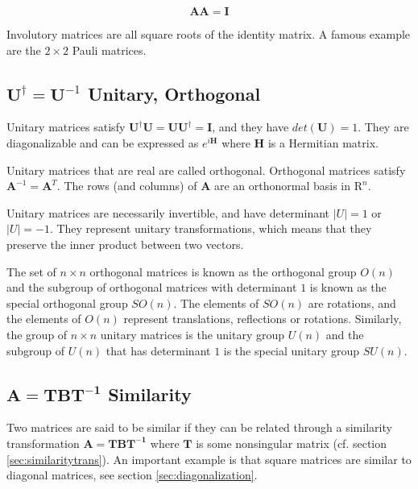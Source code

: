 \begin{equation}
\mathbf{A}\mathbf{A}=\mathbf{I}
\end{equation}

Involutory matrices are all square roots of the identity matrix. A famous example are the $2\times 2$ Pauli matrices. 




\subsection{$\mathbf{U}^{\dagger} = \mathbf{U}^{-1}$ Unitary, Orthogonal}
Unitary matrices satisfy $\mathbf{U}^{\dagger}\mathbf{U} = \mathbf{UU}^{\dagger}=\mathbf{I}$, and they have $det(\mathbf{U}) = 1$. They are diagonalizable and can be expressed as $e^{i\mathbf{H}}$ where $\mathbf{H}$ is a Hermitian matrix.

Unitary matrices that are real are called orthogonal.  Orthogonal matrices satisfy $\mathbf{A}^{-1} = \mathbf{A}^T$. The rows (and columns) of $\mathbf{A}$ are an orthonormal basis in $\mathrm{R}^n$.

Unitary matrices are necessarily invertible, and have determinant $|U|=1$ or $|U|=-1$. They represent unitary transformations, which means that they preserve the inner product between two vectors.

The set of $n \times n$ orthogonal matrices is known as the orthogonal group $O(n)$ and the subgroup of orthogonal matrices with determinant $1$ is known as the special orthogonal group $SO(n)$. The elements of $SO(n)$ are rotations, and the elements of $O(n)$ represent translations, reflections or rotations. Similarly, the group of $n \times n$ unitary matrices is the unitary group $U(n)$ and the subgroup of $U(n)$ that has determinant $1$ is the special unitary group $SU(n)$.



\subsection{$\mathbf{A} = \mathbf{TBT^{-1}}$ Similarity}
\label{sec:similiarity}
Two matrices are said to be similar if they can be related through a similarity transformation  $\mathbf{A} = \mathbf{TBT^{-1}}$ where $\mathbf{T}$ is some nonsingular matrix (cf. section \ref{sec:similaritytrans}). An important example is that square matrices are similar to diagonal matrices, see section \ref{sec:diagonalization}. 
   

